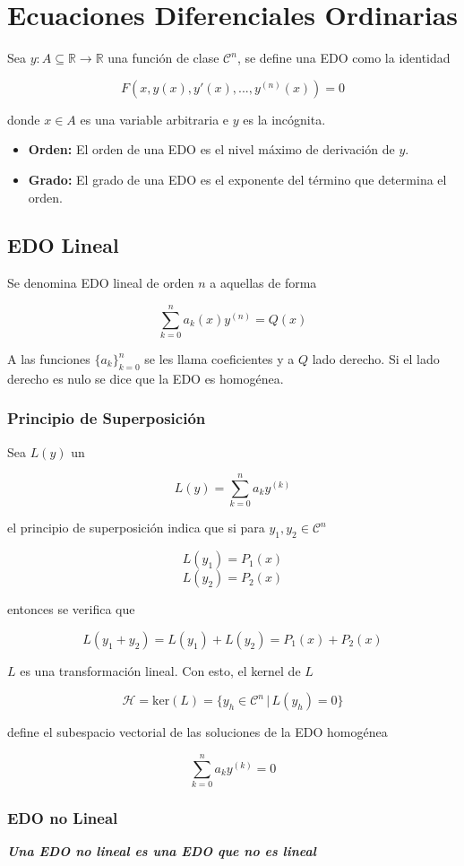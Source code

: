\chapter{Ecuaciones Diferenciales Ordinarias}

Sea $y: A\subseteq\mathbb{R}\to\mathbb{R}$ una función de clase $\mathcal{C}^n$, se define una EDO como la identidad

\[F(x, y(x),y'(x),...,y^{(n)}(x))=0\]

donde $x\in A$ es una variable arbitraria e $y$ es la incógnita.

\begin{itemize}
    \item \textbf{Orden:} El orden de una EDO es el nivel máximo de derivación de $y$.
    \item\textbf{Grado:} El grado de una EDO es el exponente del término que determina el orden.
\end{itemize}

\section{EDO Lineal}

Se denomina EDO lineal de orden $n$ a aquellas de forma

\[\sum^n_{k=0}a_k(x)y^{(n)}=Q(x)\]

A las funciones $\{a_k\}^n_{k=0}$ se les llama coeficientes y a $Q$ lado derecho. Si el lado derecho es nulo se dice que la EDO es homogénea.

\subsection{Principio de Superposición}

Sea $L(y)$ un 

\[L(y)=\sum^n_{k=0}a_ky^{(k)}\]

el principio de superposición indica que si para $y_1,y_2\in \mathcal{C}^n$

\[L(y_1)=P_1(x)\]
\[L(y_2)=P_2(x)\]

entonces se verifica que

\[L(y_1+y_2) = L(y_1) + L(y_2) = P_1(x)+P_2(x)\]

$L$ es una transformación lineal. Con esto, el kernel de $L$ 

\[\mathcal{H} = \mathrm{ker}(L) = \{y_h\in\mathcal{C}^n\,|\,L(y_h)=0\}\]

define el subespacio vectorial de las soluciones de la EDO homogénea

\[\sum^n_{k=0}a_ky^{(k)}=0\]

\subsection{EDO no Lineal}

\textbf{\textit{Una EDO no lineal es una EDO que no es lineal}}


\newpage